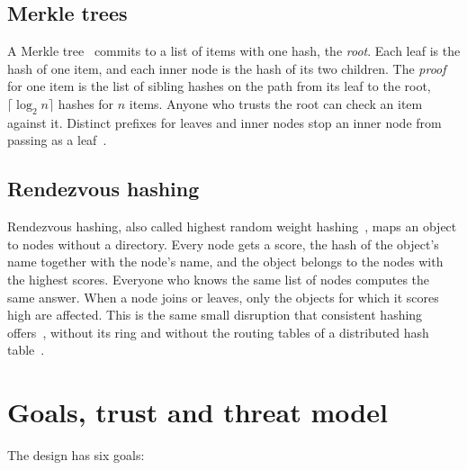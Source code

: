 \documentclass[10pt,a4paper,final]{article}
\begin{document}
\subsection{Merkle trees}

A Merkle tree~\cite{merkle1987} commits to a list of items with one hash, the \emph{root}. Each leaf is the hash of
one item, and each inner node is the hash of its two children. The \emph{proof} for one item is the list of sibling
hashes on the path from its leaf to the root, $\lceil \log_2 n \rceil$ hashes for $n$ items. Anyone who trusts the
root can check an item against it. Distinct prefixes for leaves and inner nodes stop an inner node from passing as a
leaf~\cite{rfc6962,rfc9162}.

\subsection{Rendezvous hashing}

Rendezvous hashing, also called highest random weight hashing~\cite{thaler1998}, maps an object to nodes without a
directory. Every node gets a score, the hash of the object's name together with the node's name, and the object
belongs to the nodes with the highest scores. Everyone who knows the same list of nodes computes the same answer.
When a node joins or leaves, only the objects for which it scores high are affected. This is the same small
disruption that consistent hashing offers~\cite{karger1997}, without its ring and without the routing tables of a
distributed hash table~\cite{maymounkov2002}.

\section{Goals, trust and threat model}
\label{sec:goals}

The design has six goals:
\end{document}
